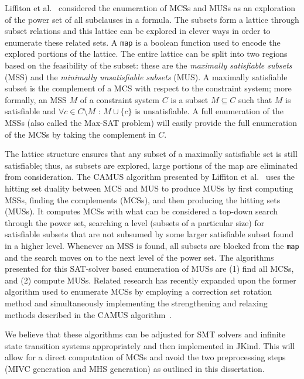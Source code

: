 Liffiton et al.~\cite{liffiton2016fast} considered the enumeration of MCSs and MUSs as an exploration of the power set of all subclauses in a formula. The subsets form a lattice through subset relations and this lattice can be explored in clever ways in order to enumerate these related sets. A \texttt{map} is a boolean function used to encode the explored portions of the lattice. The entire lattice can be split into two regions based on the feasibility of the subset: these are the {\em maximally satisfiable subsets} (MSS) and the {\em minimally unsatisfiable subsets} (MUS). A maximally satisfiable subset is the complement of a MCS with respect to the constraint system; more formally, an MSS $M$ of a constraint system $C$ is a subset $M\subseteq C$ such that $M$ is satisfiable and $\forall c \in C \setminus M$ : $M \cup \{c\}$ is unsatisfiable. A full enumeration of the MSSs (also called the Max-SAT problem) will easily provide the full enumeration of the MCSs by taking the complement in $C$. 

The lattice structure ensures that any subset of a maximally satisfiable set is still satisfiable; thus, as subsets are explored, large portions of the map are eliminated from consideration. The CAMUS algorithm presented by Liffiton et al.~\cite{liffiton2005finding} uses the hitting set duality between MCS and MUS to produce MUSs by first computing MSSs, finding the complements (MCSs), and then producing the hitting sets (MUSs). It computes MCSs with what can be considered a top-down search through the power set, searching a level (subsets of a particular size) for satisfiable subsets that are not subsumed by some larger satisfiable subset found in a higher level. Whenever an MSS is found, all subsets are blocked from the \texttt{map} and the search moves on to the next level of the power set. The algorithms presented for this SAT-solver based enumeration of MUSs are (1) find all MCSs, and (2) compute MUSs. Related research has recently expanded upon the former algorithm used to enumerate MCSs by employing a correction set rotation method and simultaneously implementing the strengthening and relaxing methods described in the CAMUS algorithm~\cite{narodytska2018core}.  

We believe that these algorithms can be adjusted for SMT solvers and infinite state transition systems appropriately and then implemented in JKind. This will allow for a direct computation of MCSs and avoid the two preprocessing steps (MIVC generation and MHS generation) as outlined in this dissertation. 




